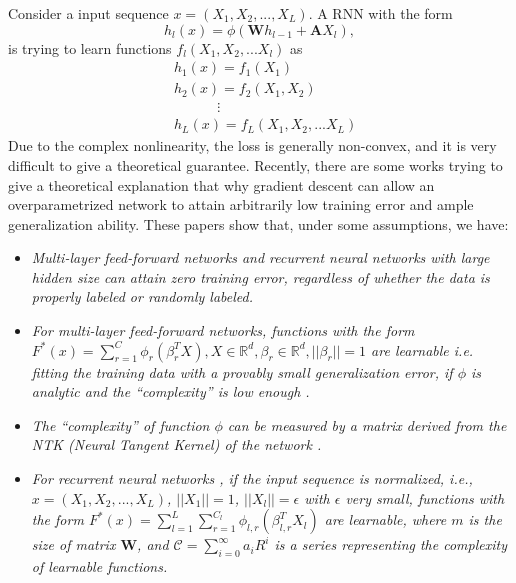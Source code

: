 \documentclass{article}
\begin{document}
Consider a input sequence $x=(X_1,X_2,...,X_L)$. A RNN with the form
\begin{equation}\label{rnne}
h_{l}(x)=\phi(\bm{W}h_{l-1}+\bm{A}X_l),
\end{equation}
 is trying to learn functions $f_l(X_1, X_2,...X_l)$ as
\begin{equation}
\begin{aligned}
&h_{1}(x)=f_1(X_1)\\
&h_{2}(x)=f_2(X_1, X_2)\\
&\ \ \ \ \ \ \ \ \ \ \ \ \ \ \vdots\\
&h_{L}(x)=f_L(X_1,X_2,...X_L)
\end{aligned}
\end{equation}
Due to the complex nonlinearity, the loss is generally non-convex, and it is very difficult to give a theoretical guarantee. Recently, there are some works \cite{allenzhu2019convergence,cao,NEURIPS201962dad6e2,DBLP,sa,rate} trying to give a theoretical explanation that why gradient descent can allow an overparametrized  network to attain arbitrarily low training error and ample generalization ability.  These papers show that, under some assumptions, we have:
\begin{itemize}
\item[$\bullet$] \emph{Multi-layer feed-forward networks \cite{allenzhu2019convergence,DBLP} and recurrent neural networks \cite{rate} with large hidden size can attain zero training error, regardless of whether the data is properly labeled or randomly labeled.}
\item[$\bullet$] \emph{For multi-layer feed-forward networks, functions with the form $F^*(x)=\sum_{r=1}^{C} \phi_{r}(\beta^T_{r}X), X\in\mathbb{R}^d,\beta_r\in\mathbb{R}^d, ||\beta_r||=1$
     are learnable i.e. fitting the training data with a provably small generalization error, if $\phi$ is analytic  and the ``complexity'' is low enough \cite{NEURIPS201962dad6e2,sa,cao}.}
\item[$\bullet$] \emph{The ``complexity'' of function $\phi$ can be measured by a matrix derived from the NTK (Neural Tangent Kernel) of the network \cite{sa,cao}.}
\item[$\bullet$] \emph{For recurrent neural networks \cite{allenzhu2019sgd}, if the input sequence is normalized, i.e., $x=(X_1,X_2,...,X_L)$, $||X_1||=1$, $||X_l||=\epsilon$ with $\epsilon$ very small,  functions with the form $F^*(x)=\sum_{l=1}^L \sum_{r=1}^{C_l} \phi_{l,r}(\beta^T_{l,r}X_l)$ are learnable, where $m$ is the size of matrix $\bm{W}$, and $\mathscr{C}=\sum_{i=0}^\infty a_iR^i $ is a series representing the complexity of learnable functions.}
\end{itemize}
\end{document}
